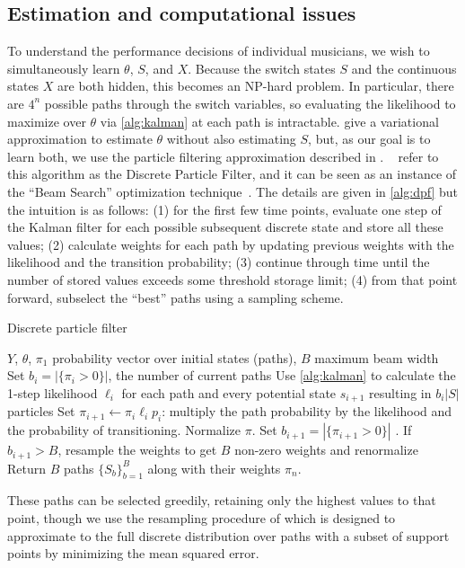 \documentclass[12pt]{article}
\begin{document}
\subsection{Estimation and computational issues}
\label{sec:computational-issues}

To understand the performance decisions of individual musicians, we
wish to simultaneously learn $\theta$, $S$, and $X$. Because the
switch states $S$ and the continuous states $X$ are both hidden, this becomes
an NP-hard problem. In particular, there are $4^n$ possible paths
through the switch variables, so evaluating the likelihood to maximize
over $\theta$ via \autoref{alg:kalman} at each path is intractable. 
\citet{GhahramaniHinton2000} give a variational approximation to
estimate $\theta$ without also estimating $S$, but, as our goal is to
learn both, we use the particle filtering approximation described in
\citep{FearnheadClifford2003}. ~\cite{WhiteleyAndrieu2010} refer to
this algorithm as the Discrete Particle Filter, and it can be seen as
an instance of the ``Beam Search'' optimization
technique~\citep{Bisiani1992}. The details are given in
\autoref{alg:dpf} but the intuition is as follows: (1) for the first
few time points, evaluate
one step of the Kalman filter for each possible subsequent discrete
state and store all these values; (2) calculate weights for each path
by updating previous weights with the likelihood and the transition probability;
(3) continue through time until the number of stored values exceeds
some threshold storage limit; (4) from that point forward, subselect
the ``best'' paths using a sampling scheme.
\begin{algorithm}[t!]
  \caption{Discrete particle filter\label{alg:dpf}}
  \begin{algorithmic}[1]
  $Y$, $\theta$, $\pi_1$ probability vector over initial states
  (paths), $B$ maximum beam width
  \STATE Set $b_i=|\{\pi_i>0\}|$, the number of current paths
  \STATE Use \autoref{alg:kalman} to calculate the 1-step likelihood
  $\ell_i$ for each path and every potential state $s_{i+1}$ resulting in $b_i|S|$ particles
  \STATE Set $\pi_{i+1} \leftarrow \pi_i\ell_i p_i$: multiply the path
  probability by the likelihood and the probability of
  transitioning. Normalize $\pi$.
  \STATE Set $b_{i+1}=|\{\pi_{i+1}>0\}|$ . If $b_{i+1} > B$, resample the
  weights to get $B$ non-zero weights and renormalize
  \ENDFOR
  \STATE Return $B$ paths $\{S_b\}_{b=1}^B$ along with their weights $\pi_{n}$.
\end{algorithmic}
\end{algorithm}
These paths can be
selected greedily, retaining only the highest values to that point,
though we use the resampling procedure of
\citep{FearnheadClifford2003} which is designed to 
approximate to the full discrete distribution over paths with a subset
of support points by minimizing the mean squared
error.
\end{document}
